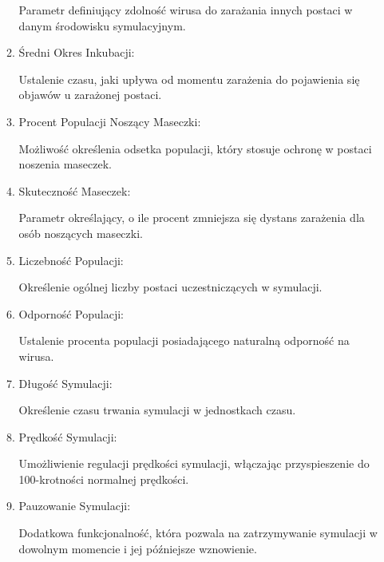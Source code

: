 \begin{itemize}
\begin{enumerate}
		Parametr definiujący zdolność wirusa do zarażania innych postaci w danym środowisku symulacyjnym.
		\item Średni Okres Inkubacji:
		
		Ustalenie czasu, jaki upływa od momentu zarażenia do pojawienia się objawów u zarażonej postaci.
		\item Procent Populacji Noszący Maseczki:
		
		Możliwość określenia odsetka populacji, który stosuje ochronę w postaci noszenia maseczek.
		\item Skuteczność Maseczek:
		
		Parametr określający, o ile procent zmniejsza się dystans zarażenia dla osób noszących maseczki.
		\item Liczebność Populacji:
		
		Określenie ogólnej liczby postaci uczestniczących w symulacji.
		\item Odporność Populacji:
		
		Ustalenie procenta populacji posiadającego naturalną odporność na wirusa.
		\item Długość Symulacji:
		
		Określenie czasu trwania symulacji w jednostkach czasu.
		\item Prędkość Symulacji:
		
		Umożliwienie regulacji prędkości symulacji, włączając przyspieszenie do 100-krotności normalnej prędkości.
		\item Pauzowanie Symulacji:
		
		Dodatkowa funkcjonalność, która pozwala na zatrzymywanie symulacji w dowolnym momencie i jej późniejsze wznowienie.
	\end{enumerate}
\end{itemize}
